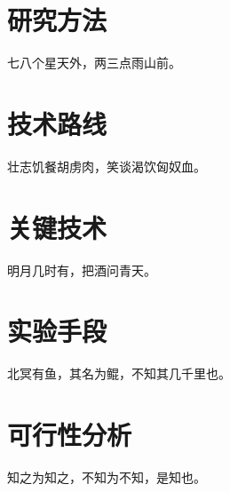\section{研究方法}

七八个星天外，两三点雨山前。

\section{技术路线}

壮志饥餐胡虏肉，笑谈渴饮匈奴血。

\section{关键技术}

明月几时有，把酒问青天。

\section{实验手段}

北冥有鱼，其名为鲲，不知其几千里也。

\section{可行性分析}

知之为知之，不知为不知，是知也。
